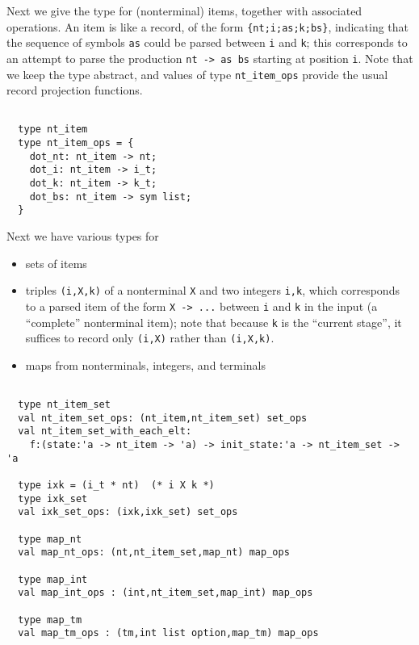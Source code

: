 \documentclass[]{article}
\begin{document}
\begin{multicols}{2}
Next we give the type for (nonterminal) items, together with associated
operations. An item is like a record, of the form
\texttt{\{nt;i;as;k;bs\}}, indicating that the sequence of symbols
\texttt{as} could be parsed between \texttt{i} and \texttt{k}; this
corresponds to an attempt to parse the production
\texttt{nt -\textgreater{} as bs} starting at position \texttt{i}. Note
that we keep the type abstract, and values of type
\texttt{nt\_item\_ops} provide the usual record projection functions.

\begin{verbatim}

  type nt_item  
  type nt_item_ops = {
    dot_nt: nt_item -> nt;
    dot_i: nt_item -> i_t;
    dot_k: nt_item -> k_t;
    dot_bs: nt_item -> sym list;
  }

\end{verbatim}

Next we have various types for

\begin{itemize}
\item
  sets of items
\item
  triples \texttt{(i,X,k)} of a nonterminal \texttt{X} and two integers
  \texttt{i,k}, which corresponds to a parsed item of the form
  \texttt{X -\textgreater{} ...} between \texttt{i} and \texttt{k} in
  the input (a ``complete'' nonterminal item); note that because
  \texttt{k} is the ``current stage'', it suffices to record only
  \texttt{(i,X)} rather than \texttt{(i,X,k)}.
\item
  maps from nonterminals, integers, and terminals
\end{itemize}

\begin{verbatim}

  type nt_item_set
  val nt_item_set_ops: (nt_item,nt_item_set) set_ops
  val nt_item_set_with_each_elt: 
    f:(state:'a -> nt_item -> 'a) -> init_state:'a -> nt_item_set -> 'a

  type ixk = (i_t * nt)  (* i X k *)
  type ixk_set
  val ixk_set_ops: (ixk,ixk_set) set_ops

  type map_nt
  val map_nt_ops: (nt,nt_item_set,map_nt) map_ops

  type map_int
  val map_int_ops : (int,nt_item_set,map_int) map_ops

  type map_tm
  val map_tm_ops : (tm,int list option,map_tm) map_ops

\end{verbatim}


\end{multicols}
\end{document}
